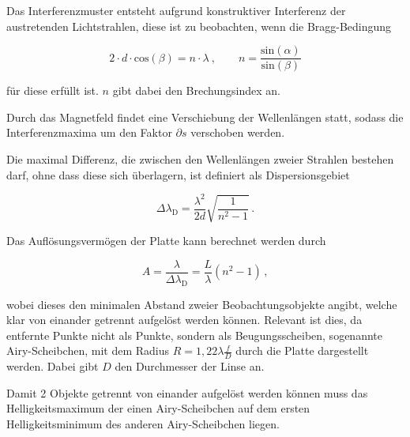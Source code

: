 \noindent
Das Interferenzmuster entsteht aufgrund konstruktiver Interferenz der austretenden Lichtstrahlen, diese ist zu beobachten, wenn die Bragg-Bedingung 

\vspace{-5pt}
\begin{equation}
    2 \cdot d \cdot \text{cos}(\beta) = n \cdot \lambda \: , 
    \qquad n = \frac{\text{sin}(\alpha)}{\text{sin}(\beta)}
\end{equation}

\noindent
für diese erfüllt ist. $n$ gibt dabei den Brechungsindex an.

\noindent
Durch das Magnetfeld findet eine Verschiebung der Wellenlängen statt, sodass die Interferenzmaxima um den Faktor $\partial s$ verschoben werden.

\noindent
Die maximal Differenz, die zwischen den Wellenlängen zweier Strahlen bestehen darf, ohne dass diese sich überlagern, ist definiert als Dispersionsgebiet


\begin{equation}
    \Delta \lambda_\text{D} = \frac{\lambda^2}{2d} \sqrt{\frac{1}{n^2-1}}\, .
    \label{eqn:lam}
\end{equation}

\noindent
Das Auflösungsvermögen der Platte kann berechnet werden durch 

\vspace{-5pt}
\begin{equation}
    A = \frac{\lambda}{\Delta \lambda_\text{D}} = \frac{L}{\lambda} (n^2 -1) \, ,
    \label{eqn:a}
\end{equation}

\noindent
wobei dieses den minimalen Abstand zweier Beobachtungsobjekte angibt, welche klar von einander getrennt aufgelöst werden können. Relevant ist dies, da entfernte Punkte nicht als Punkte,
sondern als Beugungsscheiben, sogenannte Airy-Scheibchen, mit dem Radius $ R = 1,22 \lambda \frac{f}{D}$ durch die Platte dargestellt werden. Dabei gibt $D$ den Durchmesser der 
Linse an. 

\noindent
Damit 2 Objekte getrennt von einander aufgelöst werden können muss das Helligkeitsmaximum der einen Airy-Scheibchen auf dem ersten Helligkeitsminimum des anderen Airy-Scheibchen liegen.


